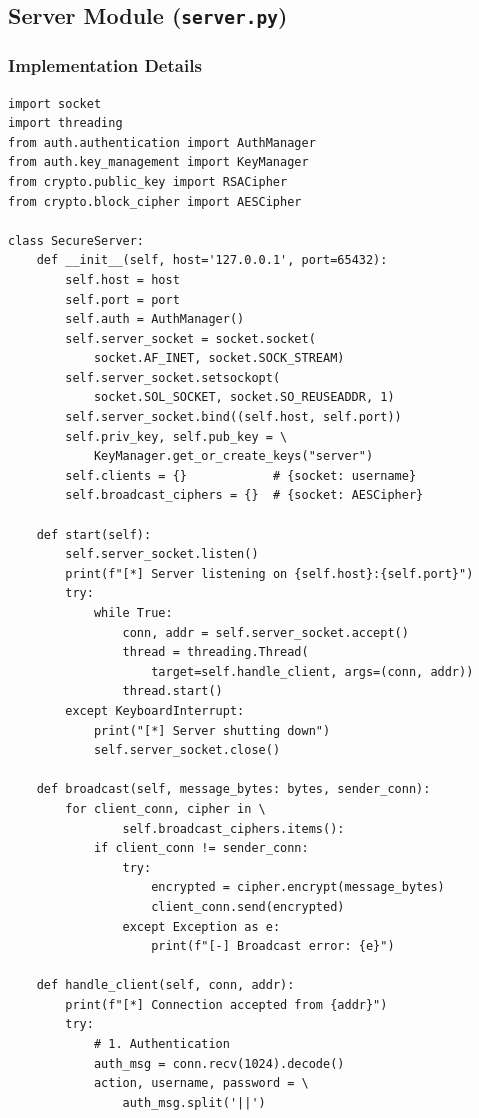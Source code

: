 \documentclass[12pt,a4paper]{article}
\begin{document}
\subsection{Server Module (\texttt{server.py})}

\subsubsection{Implementation Details}

\begin{lstlisting}[caption={Secure Server – \texttt{server.py}}]
import socket
import threading
from auth.authentication import AuthManager
from auth.key_management import KeyManager
from crypto.public_key import RSACipher
from crypto.block_cipher import AESCipher

class SecureServer:
    def __init__(self, host='127.0.0.1', port=65432):
        self.host = host
        self.port = port
        self.auth = AuthManager()
        self.server_socket = socket.socket(
            socket.AF_INET, socket.SOCK_STREAM)
        self.server_socket.setsockopt(
            socket.SOL_SOCKET, socket.SO_REUSEADDR, 1)
        self.server_socket.bind((self.host, self.port))
        self.priv_key, self.pub_key = \
            KeyManager.get_or_create_keys("server")
        self.clients = {}            # {socket: username}
        self.broadcast_ciphers = {}  # {socket: AESCipher}

    def start(self):
        self.server_socket.listen()
        print(f"[*] Server listening on {self.host}:{self.port}")
        try:
            while True:
                conn, addr = self.server_socket.accept()
                thread = threading.Thread(
                    target=self.handle_client, args=(conn, addr))
                thread.start()
        except KeyboardInterrupt:
            print("[*] Server shutting down")
            self.server_socket.close()

    def broadcast(self, message_bytes: bytes, sender_conn):
        for client_conn, cipher in \
                self.broadcast_ciphers.items():
            if client_conn != sender_conn:
                try:
                    encrypted = cipher.encrypt(message_bytes)
                    client_conn.send(encrypted)
                except Exception as e:
                    print(f"[-] Broadcast error: {e}")

    def handle_client(self, conn, addr):
        print(f"[*] Connection accepted from {addr}")
        try:
            # 1. Authentication
            auth_msg = conn.recv(1024).decode()
            action, username, password = \
                auth_msg.split('||')


\end{lstlisting}
\end{document}
